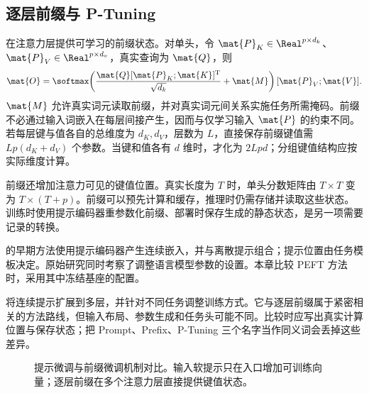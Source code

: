 \documentclass[../textbook.tex]{subfiles}
\begin{document}
\subsection{逐层前缀与 P-Tuning}
在注意力层提供可学习的前缀状态\cite{li2021prefix}。对单头，令 $\mat{P}_K\in\Real^{p\times d_k}$、$\mat{P}_V\in\Real^{p\times d_v}$，真实查询为 $\mat{Q}$，则
\begin{equation}
\mat{O}=\softmax\!\left(\frac{\mat{Q}[\mat{P}_K;\mat{K}]^{\mathrm{T}}}{\sqrt{d_k}}+\mat{M}\right)[\mat{P}_V;\mat{V}].
\label{eq:peft-prefix}
\end{equation}
$\mat{M}$ 允许真实词元读取前缀，并对真实词元间关系实施任务所需掩码。前缀不必通过输入词嵌入在每层间接产生，因而与仅学习输入 $\mat{P}$ 的约束不同。若每层键与值各自的总维度为 $d_K,d_V$，层数为 $L$，直接保存前缀键值需 $Lp(d_K+d_V)$ 个参数。当键和值各有 $d$ 维时，才化为 $2Lpd$；分组键值结构应按实际维度计算。

前缀还增加注意力可见的键值位置。真实长度为 $T$ 时，单头分数矩阵由 $T\times T$ 变为 $T\times(T+p)$。前缀可以预先计算和缓存，推理时仍需存储并读取这些状态。训练时使用提示编码器重参数化前缀、部署时保存生成的静态状态，是另一项需要记录的转换。

的早期方法使用提示编码器产生连续嵌入，并与离散提示组合\cite{liu2021ptuning}；提示位置由任务模板决定。原始研究同时考察了调整语言模型参数的设置。本章比较 PEFT 方法时，采用其中冻结基座的配置。

将连续提示扩展到多层，并针对不同任务调整训练方式\cite{liu2022ptuningv2}。它与逐层前缀属于紧密相关的方法路线，但输入布局、参数生成和任务头可能不同。比较时应写出真实计算位置与保存状态；把 Prompt、Prefix、P-Tuning 三个名字当作同义词会丢掉这些差异。

\begin{figure}[htbp]
\centering
{}
\caption[提示微调与前缀微调机制对比]{提示微调与前缀微调机制对比。输入软提示只在入口增加可训练向量；逐层前缀在多个注意力层直接提供键值状态。}\label{fig:peft-prompts}
\end{figure}
\end{document}

